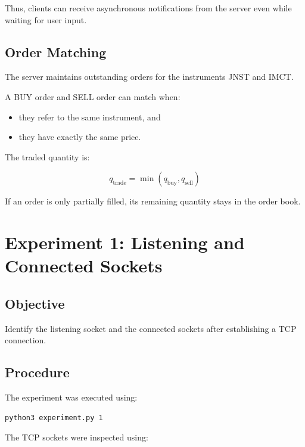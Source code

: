 \documentclass[11pt,a4paper]{article}
\begin{document}
Thus, clients can receive asynchronous notifications from the server even
while waiting for user input.

\subsection{Order Matching}

The server maintains outstanding orders for the instruments JNST and IMCT.

A BUY order and SELL order can match when:

\begin{itemize}
    \item they refer to the same instrument, and
    \item they have exactly the same price.
\end{itemize}

The traded quantity is:

\[
q_{\text{trade}}
=
\min(q_{\text{buy}},q_{\text{sell}})
\]

If an order is only partially filled, its remaining quantity stays in the
order book.



\section{Experiment 1: Listening and Connected Sockets}

\subsection{Objective}

Identify the listening socket and the connected sockets after establishing a
TCP connection.

\subsection{Procedure}

The experiment was executed using:

\begin{verbatim}
python3 experiment.py 1
\end{verbatim}

The TCP sockets were inspected using:
\end{document}
